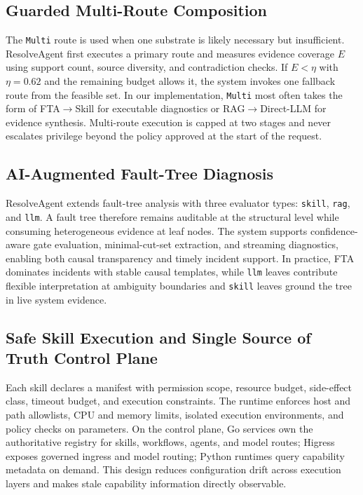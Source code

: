 \documentclass[conference]{IEEEtran}
\begin{document}
\subsection{Guarded Multi-Route Composition}
The \texttt{Multi} route is used when one substrate is likely necessary but insufficient. ResolveAgent first executes a primary route and measures evidence coverage $E$ using support count, source diversity, and contradiction checks. If $E<\eta$ with $\eta=0.62$ and the remaining budget allows it, the system invokes one fallback route from the feasible set. In our implementation, \texttt{Multi} most often takes the form of FTA$\rightarrow$Skill for executable diagnostics or RAG$\rightarrow$Direct-LLM for evidence synthesis. Multi-route execution is capped at two stages and never escalates privilege beyond the policy approved at the start of the request.

\subsection{AI-Augmented Fault-Tree Diagnosis}
ResolveAgent extends fault-tree analysis with three evaluator types: \texttt{skill}, \texttt{rag}, and \texttt{llm}. A fault tree therefore remains auditable at the structural level while consuming heterogeneous evidence at leaf nodes. The system supports confidence-aware gate evaluation, minimal-cut-set extraction, and streaming diagnostics, enabling both causal transparency and timely incident support. In practice, FTA dominates incidents with stable causal templates, while \texttt{llm} leaves contribute flexible interpretation at ambiguity boundaries and \texttt{skill} leaves ground the tree in live system evidence.

\subsection{Safe Skill Execution and Single Source of Truth Control Plane}
Each skill declares a manifest with permission scope, resource budget, side-effect class, timeout budget, and execution constraints. The runtime enforces host and path allowlists, CPU and memory limits, isolated execution environments, and policy checks on parameters. On the control plane, Go services own the authoritative registry for skills, workflows, agents, and model routes; Higress exposes governed ingress and model routing; Python runtimes query capability metadata on demand. This design reduces configuration drift across execution layers and makes stale capability information directly observable.
\end{document}
